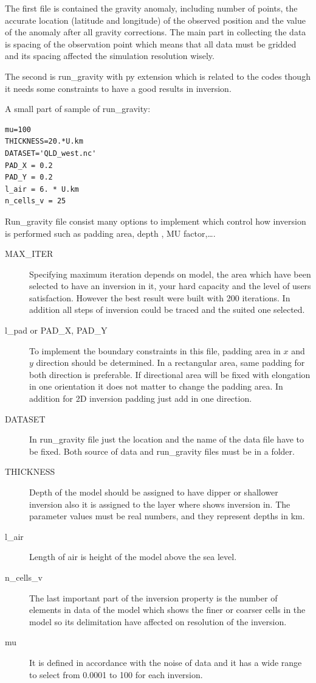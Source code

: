 The first file is contained the gravity anomaly, including number of points, the accurate location (latitude and longitude) of the observed position and the value of the anomaly after all gravity corrections. The main part in collecting the data is spacing of the observation point which means that all data must be gridded and its spacing affected the simulation resolution wisely.

The second is run_gravity with py extension which is related to the codes though it needs some constraints to have a good results in inversion.

A small part of sample of run_gravity:

\begin{verbatim}
mu=100
THICKNESS=20.*U.km
DATASET='QLD_west.nc'
PAD_X = 0.2
PAD_Y = 0.2
l_air = 6. * U.km
n_cells_v = 25
\end{verbatim}

Run_gravity file consist many options to implement which control how inversion is performed such as padding area, depth , MU factor,\ldots.

\begin{description} 	
\item[MAX\_ITER]
Specifying maximum iteration depends on model, the area which have been selected to have an inversion in it, your hard capacity and the level of users satisfaction. However the best result were built with 200 iterations. In addition all steps of inversion could be traced and the suited one selected.

\item[l_pad or PAD\_X, PAD\_Y] To implement the boundary constraints in this file, padding area in $x$ and $y$ direction should be determined. In a rectangular area, same padding for both direction is preferable. If directional area will be fixed with elongation in one orientation it does not matter to change the padding area. In addition for 2D inversion padding just add in one direction.

\item[DATASET] In run_gravity file just the location and the name of the data file have to be fixed. Both source of data and run_gravity files must be in a folder. 

\item[THICKNESS] Depth of the model should be assigned to have dipper or shallower inversion also it is assigned to the layer where shows inversion in. The parameter values must be real numbers, and they represent depths in km.

\item[l_air] Length of air is height of the model above the sea level. 

\item[n_cells_v] The last important part of the inversion property is the number of elements in data of the model which shows the finer or coarser cells in the model so its delimitation have affected on resolution of the inversion.

\item[mu]It is defined in accordance with the noise of data and it has a wide range to select from 0.0001 to 100 for each inversion.

\end{description}

